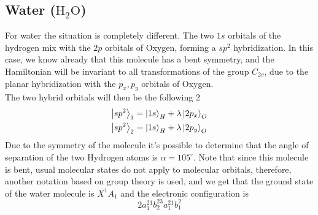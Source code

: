 \documentclass[../qm.tex]{subfiles}
\begin{document}
	\subsection{Water ($\mathrm{H_2O}$)}
	For water the situation is completely different. The two $1s$ orbitals of the hydrogen mix with the $2p$ orbitals of Oxygen, forming a $sp^2$ hybridization. In this case, we know already that this molecule has a bent symmetry, and the Hamiltonian will be invariant to all transformations of the group $C_{2v}$, due to the planar hybridization with the $p_x,p_y$ orbitals of Oxygen.\\
	The two hybrid orbitals will then be the following 2
	\begin{equation}
		\begin{aligned}
			\ket{sp^2}_1&=\ket{1s}_H+\lambda\ket{2p_x}_O\\
			\ket{sp^2}_2&=\ket{1s}_H+\lambda\ket{2p_y}_O
		\end{aligned}
		\label{eq:sp2h2ohyb}
	\end{equation}
	Due to the symmetry of the molecule it's possible to determine that the angle of separation of the two Hydrogen atoms is $\alpha=105^{\circ}$. Note that since this molecule is bent, usual molecular states do not apply to molecular orbitals, therefore, another notation based on group theory is used, and we get that the ground state of the water molecule is $X^1A_1$ and the electronic configuration is
	\begin{equation*}
		2a_1^21b_2^23a_1^21b_1^2
	\end{equation*}
\end{document}
